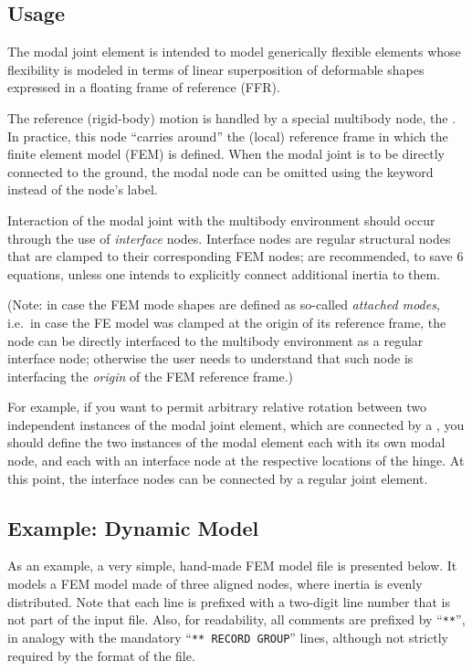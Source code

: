\subsection{Usage}
The modal joint element is intended to model generically flexible elements
whose flexibility is modeled in terms of linear superposition
of deformable shapes expressed in a floating frame of reference (FFR).

The reference (rigid-body) motion is handled by a special multibody node,
the .  
In practice, this node ``carries around'' the (local) reference frame
in which the finite element model (FEM) is defined.
When the modal joint is to be directly connected to the ground,
the modal node can be omitted using the  keyword
instead of the node's label.

Interaction of the modal joint with the multibody environment should occur
through the use of \emph{interface} nodes.
Interface nodes are regular structural nodes that are clamped 
to their corresponding FEM nodes;
 are recommended, to save 6 equations,
unless one intends to explicitly connect additional inertia to them.

(Note: in case the FEM mode shapes are defined as so-called \emph{attached modes},
i.e.\ in case the FE model was clamped at the origin of its reference frame,
the  node can be directly interfaced to the multibody environment as a regular interface node;
otherwise the user needs to understand that such node is interfacing the \emph{origin}
of the FEM reference frame.)

For example, if you want to permit arbitrary relative rotation
between two independent instances of the modal joint element,
which are connected by a ,
you should define the two instances of the modal element each with its own modal node,
and each with an interface node at the respective locations of the hinge.
At this point, the interface nodes can be connected
by a regular  joint element.




\subsection{Example: Dynamic Model}
\label{sec:APP:EL:STRUCT:JOINT:MODAL:DYNAMIC-MODEL}
As an example, a very simple, hand-made FEM model file is presented below.
It models a FEM model made of three aligned nodes, where inertia 
is evenly distributed.
Note that each line is prefixed with a two-digit line number 
that is not part of the input file.
Also, for readability, all comments are prefixed by ``\texttt{**}'', in analogy
with the mandatory ``\texttt{** RECORD GROUP}'' lines, although not strictly
required by the format of the file.

